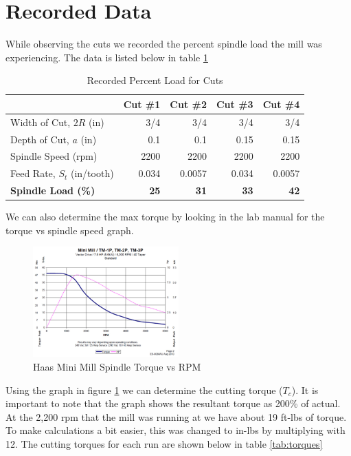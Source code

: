 \documentclass[12pt]{article}
\begin{document}
\section{Recorded Data}
While observing the cuts we recorded the percent spindle load the mill was experiencing. The data is listed below in table \ref{tab:percentload}

\begin{table}[htbp]
  \centering
  \caption{Recorded Percent Load for Cuts}
    \begin{tabular}{|l|rrrr|}
    \hline
          & \multicolumn{1}{l}{Cut \#1} & \multicolumn{1}{l}{Cut \#2} & \multicolumn{1}{l}{Cut \#3 } & \multicolumn{1}{l|}{Cut \#4} \\
    \hline
    Width of Cut, $2R$ (in) & 3/4   & 3/4   & 3/4   & 3/4 \\
    Depth of Cut, $a$ (in) & 0.1   & 0.1   & 0.15  & 0.15 \\
    Spindle Speed (rpm) & 2200  & 2200  & 2200  & 2200 \\
    Feed Rate, $S_t$ (in/tooth) & 0.034 & 0.0057 & 0.034 & 0.0057 \\
    \textbf{Spindle Load (\%)} & \textbf{25} & \textbf{31} & \textbf{33} & \textbf{42} \\
    \hline
    \end{tabular}%
  \label{tab:percentload}%
\end{table}%

We can also determine the max torque by looking in the lab manual for the torque vs spindle speed graph.
\begin{figure}[h!]
    \centering
    \includegraphics[width=0.5\textwidth]{rpm_vs_torque.png}
    \caption{Haas Mini Mill Spindle Torque vs RPM}
    \label{fig:rpmvstc}
\end{figure}

Using the graph in figure \ref{fig:rpmvstc} we can determine the cutting torque ($T_c$). It is important to note that the graph shows the resultant torque as 200\% of actual. At the 2,200 rpm that the mill was running at we have about 19 ft-lbs of torque. To make calculations a bit easier, this was changed to in-lbs by multiplying with 12. The cutting torques for each run are shown below in table \ref{tab:torques}
\end{document}

